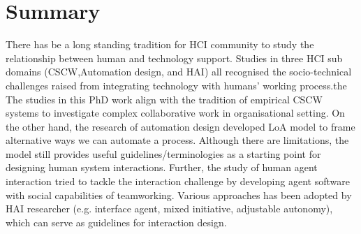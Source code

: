 

\section{Summary}


There has be a long standing tradition for \ac{HCI} community to study the relationship between human and technology support. Studies in three \ac{HCI} sub domains (\ac{CSCW},Automation design, and \acf{HAI}) all recognised the socio-technical challenges raised from integrating technology with humans' working process.the  The studies in this PhD work align with the tradition of empirical \ac{CSCW} systems to investigate complex collaborative work in organisational setting.  On the other hand, the research of automation design developed \ac{LoA} model to frame alternative ways we can automate a process. Although there are limitations, the model still provides useful guidelines/terminologies as a starting point for designing human system interactions. Further, the study of human agent interaction tried to tackle the interaction challenge by developing agent software with social capabilities of teamworking. Various approaches has been adopted by \ac{HAI} researcher (e.g. interface agent, mixed initiative, adjustable autonomy), which can serve as guidelines for interaction design.\\

